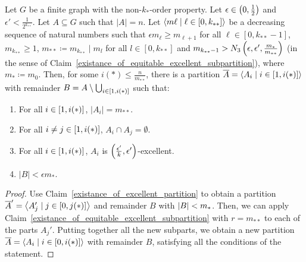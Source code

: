 
    \lemma[Claim 5.14.1a]\label{existance_of_excellent_partition_with_equal_size}
        Let $G$ be a finite graph with the non-$k_{*}$-order property.
        Let $\epsilon \in \left( 0, \frac{1}{2} \right)$ and $\epsilon' < \frac{1}{2^{k_{**}}}$.
        Let $A \subseteq G$ such that $|A| = n$.
        Let $\left< m\ell \mid \ell \in [0, k_{**}] \right>$ be a decreasing sequence of natural numbers such that
        $\epsilon m_{\ell} \geq m_{\ell+1}$ for all $\ell \in [0, k_{**}-1]$, $m_{k_{**}} \geq 1$,
        $m_{**} \coloneq m_{k_{**}} \mid m_l$ for all $l \in [0, k_{**}]$ and
        $m_{k_{**}-1} > N_3\left( \epsilon, \epsilon', \frac{m_*}{m_{**}} \right)$
        (in the sense of Claim~\ref{existance_of_equitable_excellent_subpartition}), where $m_* \coloneq m_0$.
        Then, for some $i(*) \leq \frac{n}{m_{**}}$, there is a partition $\overline{A} = \left< A_i \mid i \in \left[ 1, i(*) \right] \right>$
        with remainder $B = A \setminus \bigcup_{i \in \left[ 1, i(*) \right]}$ such that:
        \begin{enumerate}[label=(\alph*), ref=\alph*]
            \item \label{itm:5.14.1a.a} For all $i \in \left[ 1, i(*) \right]$, $|A_i| = m_{**}$.
            \item \label{itm:5.14.1a.b} For all $i \neq j \in \left[ 1, i(*) \right]$, $A_i \cap A_j = \emptyset$.
            \item \label{itm:5.14.1a.c} For all $i \in \left[ 1, i(*) \right]$, $A_i$ is $\left( \frac{\epsilon'}{k}, \epsilon' \right)$-excellent.
            \item \label{itm:5.14.1a.d} $|B| < \epsilon m_*$.
        \end{enumerate}
        \begin{proof}
            Use Claim~\ref{existance_of_excellent_partition} to obtain a partition
            $\overline{A}' = \left< A_j' \mid j \in \left[ 0, j(*) \right] \right>$ and remainder $B$ with $\left| B \right| < m_*$.
            Then, we can apply Claim~\ref{existance_of_equitable_excellent_subpartition} with $r = m_{**}$ to each of
            the parts $A_j'$.
            Putting together all the new subparts, we obtain a new partition $\overline{A} = \left< A_i \mid i \in \left[ 0, i(*) \right] \right>$
            with remainder $B$, satisfying all the conditions of the statement.
        \end{proof}

